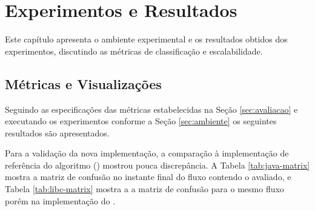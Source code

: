 


% 
% 

\chapter{Experimentos e Resultados}\label{cha:results}

Este capítulo apresenta o ambiente experimental e os resultados obtidos dos
experimentos, discutindo as métricas de classificação e escalabilidade.


% 

\section{Métricas e Visualizações}
\label{sec:experiments}

Seguindo as especificações das métricas estabelecidas na Seção
\ref{sec:avaliacao} e executando os experimentos conforme a Seção
\ref{sec:ambiente} os seguintes resultados são apresentados.

Para a validação da nova implementação, a comparação à implementação de
referência do algoritmo \minas () mostrou pouca discrepância.
A Tabela \ref{tab:java-matrix} mostra a matriz de confusão no instante final do
fluxo contendo o \dataset avaliado, e Tabela \ref{tab:libc-matrix} mostra a
a matriz de confusão para o mesmo fluxo porém na implementação do \mfog.

